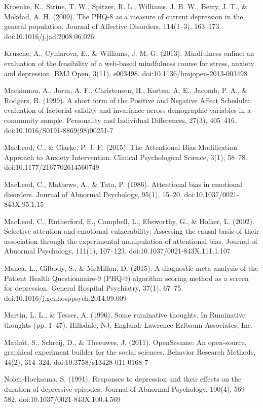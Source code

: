 \documentclass[man,a4paper]{apa6}
\begin{document}
Kroenke, K., Strine, T. W., Spitzer, R. L., Williams, J. B. W., Berry, J. T., \& Mokdad, A. H. (2009). The PHQ-8 as a measure of current depression in the general population. Journal of Affective Disorders, 114(1--3), 163--173. doi:10.1016/j.jad.2008.06.026

Krusche, A., Cyhlarova, E., \& Williams, J. M. G. (2013). Mindfulness online: an evaluation of the feasibility of a web-based mindfulness course for stress, anxiety and depression. BMJ Open, 3(11), e003498. doi:10.1136/bmjopen-2013-003498

Mackinnon, A., Jorm, A. F., Christensen, H., Korten, A. E., Jacomb, P. A., \& Rodgers, B. (1999). A short form of the Positive and Negative Affect Schedule: evaluation of factorial validity and invariance across demographic variables in a community sample. Personality and Individual Differences, 27(3), 405--416. doi:10.1016/S0191-8869(98)00251-7

MacLeod, C., \& Clarke, P. J. F. (2015). The Attentional Bias Modification Approach to Anxiety Intervention. Clinical Psychological Science, 3(1), 58--78. doi:10.1177/2167702614560749

MacLeod, C., Mathews, A., \& Tata, P. (1986). Attentional bias in emotional disorders. Journal of Abnormal Psychology, 95(1), 15--20. doi:10.1037/0021-843X.95.1.15

MacLeod, C., Rutherford, E., Campbell, L., Ebsworthy, G., \& Holker, L. (2002). Selective attention and emotional vulnerability: Assessing the causal basis of their association through the experimental manipulation of attentional bias. Journal of Abnormal Psychology, 111(1), 107--123. doi:10.1037/0021-843X.111.1.107

Manea, L., Gilbody, S., \& McMillan, D. (2015). A diagnostic meta-analysis of the Patient Health Questionnaire-9 (PHQ-9) algorithm scoring method as a screen for depression. General Hospital Psychiatry, 37(1), 67--75. doi:10.1016/j.genhosppsych.2014.09.009

Martin, L. L., \& Tesser, A. (1996). Some ruminative thoughts. In Ruminative thoughts (pp. 1--47). Hillsdale, NJ, England: Lawrence Erlbaum Associates, Inc.

Math\^ot, S., Schreij, D., \& Theeuwes, J. (2011). OpenSesame: An open-source, graphical experiment builder for the social sciences. Behavior Research Methods, 44(2), 314--324. doi:10.3758/s13428-011-0168-7

Nolen-Hoeksema, S. (1991). Responses to depression and their effects on the duration of depressive episodes. Journal of Abnormal Psychology, 100(4), 569--582. doi:10.1037/0021-843X.100.4.569
\end{document}
